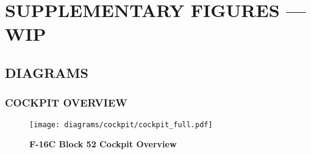 \appendix
\chapter{SUPPLEMENTARY FIGURES --- WIP}
\localtableofcontents
\cleardoublepage


\section{DIAGRAMS}

\subsection{COCKPIT OVERVIEW}
\begin{figure}[h]
    \centering
    \texttt{[image: diagrams/cockpit/cockpit\_full.pdf]}
    \caption{\textbf{F-16C Block 52 Cockpit Overview}}
    \label{fig:cockpitoverview}
\end{figure}

\cleardoublepage